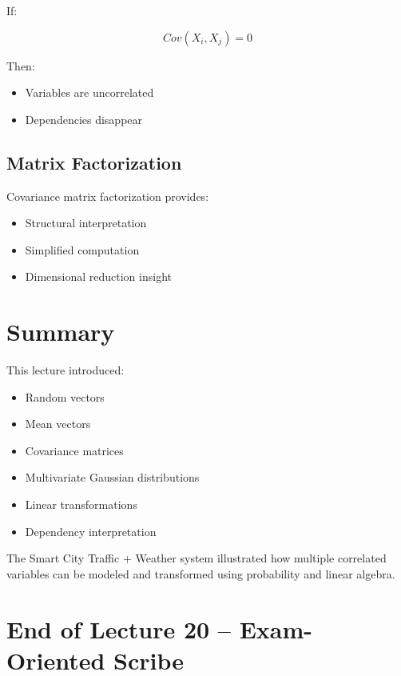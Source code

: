 \documentclass[11pt]{article}
\begin{document}
If:

\[
Cov(X_i, X_j) = 0
\]

Then:

\begin{itemize}
\item Variables are uncorrelated
\item Dependencies disappear
\end{itemize}

\subsection{Matrix Factorization}

Covariance matrix factorization provides:

\begin{itemize}
\item Structural interpretation
\item Simplified computation
\item Dimensional reduction insight
\end{itemize}

\section{Summary}

This lecture introduced:

\begin{itemize}
\item Random vectors
\item Mean vectors
\item Covariance matrices
\item Multivariate Gaussian distributions
\item Linear transformations
\item Dependency interpretation
\end{itemize}

The Smart City Traffic + Weather system illustrated how multiple correlated variables can be modeled and transformed using probability and linear algebra.

\section*{End of Lecture 20 -- Exam-Oriented Scribe}
\end{document}
